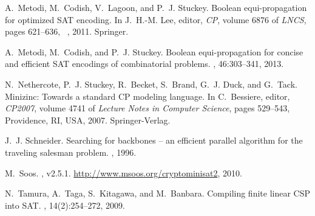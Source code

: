 \documentclass[runningheads,a4paper]{llncs}
\begin{document}
\begin{thebibliography}{10}
A.~Metodi, M.~Codish, V.~Lagoon, and P.~J. Stuckey.
\newblock Boolean equi-propagation for optimized {SAT} encoding.
\newblock In J.~H.-M. Lee, editor, {\em CP}, volume 6876 of {\em LNCS}, pages
  621--636, ~, 2011. Springer.

A.~Metodi, M.~Codish, and P.~J. Stuckey.
\newblock Boolean equi-propagation for concise and efficient {SAT} encodings of
  combinatorial problems.
, 46:303--341, 2013.

N.~Nethercote, P.~J. Stuckey, R.~Becket, S.~Brand, G.~J. Duck, and G.~Tack.
\newblock Minizinc: Towards a standard {CP} modeling language.
\newblock In C.~Bessiere, editor, {\em CP2007}, volume 4741 of {\em Lecture
  Notes in Computer Science}, pages 529--543, Providence, RI, USA, 2007.
  Springer-Verlag.

J.~J. Schneider.
\newblock Searching for backbones -- an efficient parallel algorithm for the
  traveling salesman problem.
, 1996.

M.~Soos.
, v2.5.1.
\newblock \url{http://www.msoos.org/cryptominisat2}, 2010.

N.~Tamura, A.~Taga, S.~Kitagawa, and M.~Banbara.
\newblock Compiling finite linear {CSP} into {SAT}.
, 14(2):254--272, 2009.

\end{thebibliography}
\end{document}
